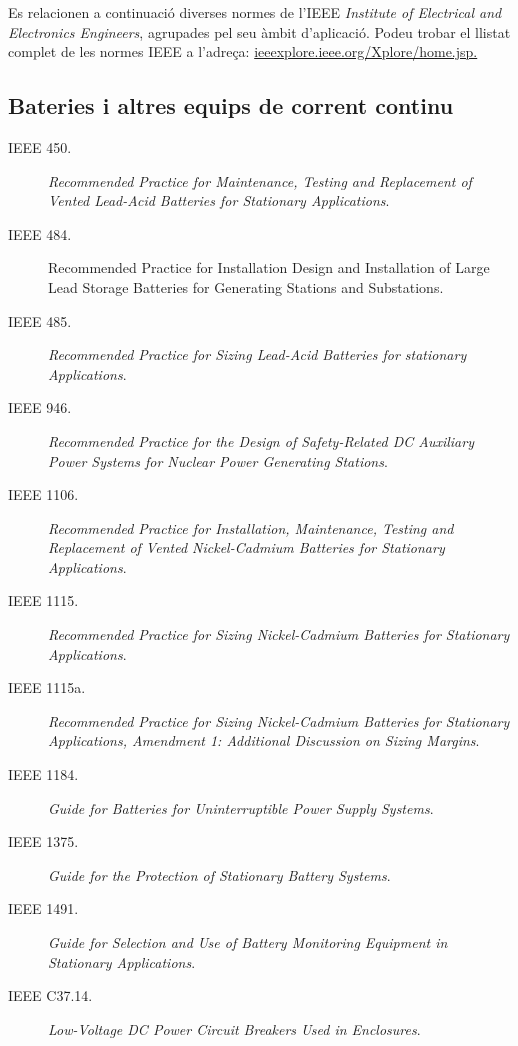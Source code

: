 Es relacionen a continuació diverses normes de l'IEEE \textit{Institute of Electrical and Electronics Engineers}, agrupades pel seu àmbit d'aplicació. Podeu trobar el llistat complet de les normes IEEE a l'adreça: \href{http://ieeexplore.ieee.org/Xplore/home.jsp}{ieeexplore.ieee.org/Xplore/home.jsp.}

\subsection*{Bateries i altres equips de corrent continu}
\begin{description}
    \item [\hspace{5mm}IEEE 450.] \textit{Recommended Practice for  Maintenance, Testing and Replacement of Vented Lead-Acid Batteries for Stationary Applications}.
    \item [\hspace{5mm}IEEE 484.] Recommended Practice for Installation Design and Installation of Large Lead Storage Batteries for Generating Stations and Substations.
    \item [\hspace{5mm}IEEE 485.] \textit{Recommended Practice for Sizing Lead-Acid Batteries for stationary Applications}.
    \item [\hspace{5mm}IEEE 946.] \textit{Recommended Practice for the Design of Safety-Related DC Auxiliary Power Systems for Nuclear Power Generating Stations}.
    \item [\hspace{5mm}IEEE 1106.] \textit{Recommended Practice for Installation, Maintenance, Testing and Replacement of Vented Nickel-Cadmium Batteries for Stationary Applications}.
    \item [\hspace{5mm}IEEE 1115.] \textit{Recommended Practice for Sizing Nickel-Cadmium Batteries for Stationary Applications}.
    \item [\hspace{5mm}IEEE 1115a.] \textit{Recommended Practice for Sizing Nickel-Cadmium Batteries for Stationary Applications, Amendment 1: Additional Discussion on Sizing Margins}.
    \item [\hspace{5mm}IEEE 1184.] \textit{Guide for Batteries for Uninterruptible Power Supply Systems}.
    \item [\hspace{5mm}IEEE 1375.] \textit{Guide for the Protection of Stationary Battery Systems}.
    \item [\hspace{5mm}IEEE 1491.] \textit{Guide for Selection and Use of Battery Monitoring Equipment in Stationary Applications}.
    \item [\hspace{5mm}IEEE C37.14.] \textit{Low-Voltage DC Power Circuit Breakers Used in Enclosures}.
\end{description}


